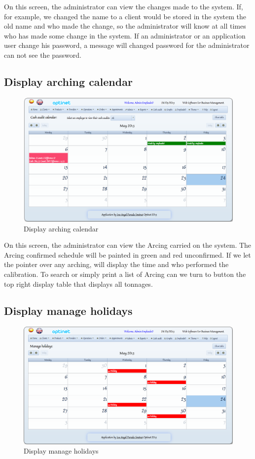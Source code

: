 \documentclass[a4paper,11pt]{book}
\begin{document}
On this screen, the administrator can view the changes made to the system. If, for example, we changed the name to a client would be stored in the system the old name and who made the change, so the administrator will know at all times who has made some change in the system. If an administrator or an application user change his password, a message will changed password for the administrator can not see the password.

\newpage
\subsection {Display arching calendar}

\begin{figure}[!htb]
  \centering
    \includegraphics[scale=0.35]{icapcalendarioarqueos.png}
  \caption{Display arching calendar}
  \label{a}
\end{figure}

On this screen, the administrator can view the Arcing carried on the system. The Arcing confirmed schedule will be painted in green and red unconfirmed. If we let the pointer over any arching, will display the time and who performed the calibration. To search or simply print a list of Arcing can we turn to button the top right display table that displays all tonnages.


\newpage
\subsection {Display manage holidays}

\begin{figure}[!htb]
  \centering
    \includegraphics[scale=0.35]{icapfestivos.png}
  \caption{Display manage holidays}
  \label{a}
\end{figure}
\end{document}
